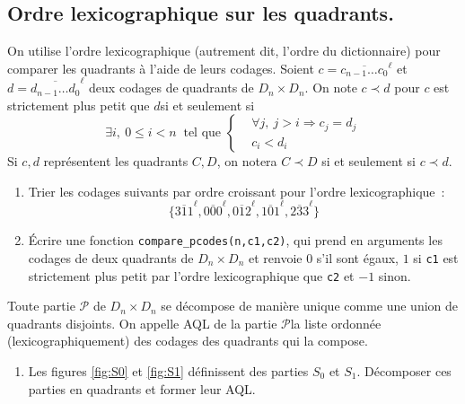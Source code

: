 \subsection{Ordre lexicographique sur les quadrants.}
On utilise l'ordre lexicographique (autrement dit, l'ordre du dictionnaire) pour comparer les quadrants à l'aide de leurs codages.\newline
Soient $c=\overline{c_{n-1}\dots c_0}^\ell$ et $d=\overline{d_{n-1}\dots d_0}^\ell$ deux codages de quadrants de $D_n\times D_n$.
On note $c \prec d$ pour \og$c$ est strictement plus petit que $d$\fg si et seulement si
\[
\exists i,\ 0\leq i< n\ \text{ tel que }
\left\lbrace 
\begin{aligned}
 &\forall j,\ j>i\Rightarrow c_j=d_j \\ &c_i < d_i
\end{aligned}
\right. 
\]
Si $c, d$ représentent les quadrants $C,D$, on notera $C \prec D$ si et seulement si $c \prec d$. 
\begin{enumerate}[resume]
\item Trier les codages suivants par ordre croissant pour l'ordre lexicographique~:
\[\{\overline{311}^\ell,\overline{000}^\ell,\overline{012}^\ell,\overline{101}^\ell,\overline{233}^\ell\}\]
\item \'Ecrire une fonction {\tt compare\_pcodes(n,c1,c2)}, qui prend en arguments les codages de deux quadrants de $D_n\times D_n$ et renvoie $0$ s'il sont \'egaux, $1$ si {\tt c1} est strictement plus petit par l'ordre lexicographique que {\tt c2} et $-1$ sinon.
\end{enumerate}
Toute partie $\mathcal{P}$ de $D_n\times D_n$ se décompose de manière unique comme une union de quadrants disjoints. On appelle \og AQL de la partie $\mathcal{P}$\fg la liste ordonnée (lexicographiquement) des codages des quadrants qui la compose.

\begin{enumerate}[resume]
 \item Les figures \ref{fig:S0} et \ref{fig:S1} définissent des parties $S_0$ et $S_1$. Décomposer ces parties en quadrants et former leur AQL.
\end{enumerate}

